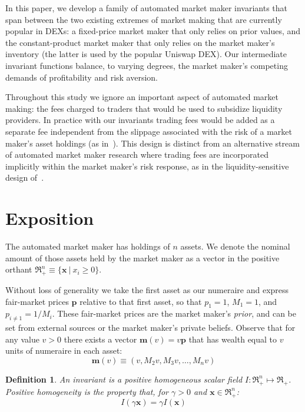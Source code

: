 \documentclass[11pt]{article}
\renewcommand{\vec}[1]{\mathbf{ #1 }}
\newtheorem{defn}{Definition}
\begin{document}
In this paper, we develop a family of automated market maker invariants that span between the two existing extremes of market making that are currently popular in DEXs: a fixed-price market maker that {only} relies on prior values, and the constant-product market maker that {only} relies on the market maker's inventory (the latter is used by the popular Uniswap DEX). Our intermediate invariant functions balance, to varying degrees, the market maker's competing demands of profitability and risk aversion.


Throughout this study we ignore an important aspect of automated market making: the fees charged to traders that would be used to subsidize liquidity providers. In practice with our invariants trading fees would be added as a separate fee independent from the slippage associated with the risk of a market maker's asset holdings (as in~\citet{Othman12:Profit}). 
%
This design is distinct from an alternative stream of automated market maker research where trading fees are incorporated implicitly within the market maker's risk response, as in the liquidity-sensitive design of~\citet{Othman13:OPRS}.

\section{Exposition}

The automated market maker has holdings of $n$ assets. We denote the nominal amount of those assets held by the market maker as a vector in the positive orthant $\Re_+^n \equiv \{\vec{x}\ |\ x_i \geq 0 \}$.

Without loss of generality we take the first asset as our numeraire and express fair-market prices $\vec{p}$ relative to that first asset, so that $p_1 = 1$, $M_1=1$, and $p_{i \neq 1} = 1/M_i$. These fair-market prices are the market maker's \emph{prior}, and can be set from external sources or the market maker's private beliefs. Observe that for any value $v > 0$ there exists a vector $\vec{m}(v) = v\vec{p}$ that has wealth equal to $v$ units of numeraire in each asset:
\[ \vec{m}(v) \equiv \left( v, M_2v, M_3v, \ldots, M_nv\right)  \]

\begin{defn}
An \emph{invariant} is a positive homogeneous scalar field $I : \Re_+^n \mapsto \Re_+$. Positive homogeneity is the property that, for $\gamma > 0$ and $\vec{x} \in \Re_+^n$:
\[ I(\gamma\vec{x}) = \gamma I(\vec{x}) \]
\end{defn}
\end{document}
